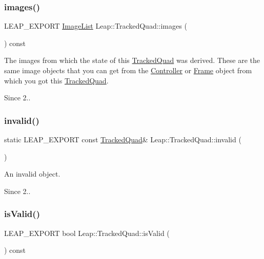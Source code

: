 \subsubsection{\texorpdfstring{images()}{images()}}
{\footnotesize\ttfamily L\+E\+A\+P\+\_\+\+E\+X\+P\+O\+RT \hyperlink{class_leap_1_1_image_list}{Image\+List} Leap\+::\+Tracked\+Quad\+::images (\begin{DoxyParamCaption}{ }\end{DoxyParamCaption}) const}

The images from which the state of this \hyperlink{class_leap_1_1_tracked_quad}{Tracked\+Quad} was derived. These are the same image objects that you can get from the \hyperlink{class_leap_1_1_controller}{Controller} or \hyperlink{class_leap_1_1_frame}{Frame} object from which you got this \hyperlink{class_leap_1_1_tracked_quad}{Tracked\+Quad}. 
\begin{DoxyCodeInclude}
\end{DoxyCodeInclude}
 \begin{DoxySince}{Since}
2.. 
\end{DoxySince}
\mbox{\label{class_leap_1_1_tracked_quad_ab9742292d499c87642dcadfde87385c5}} 
\subsubsection{\texorpdfstring{invalid()}{invalid()}}
{\footnotesize\ttfamily static L\+E\+A\+P\+\_\+\+E\+X\+P\+O\+RT const \hyperlink{class_leap_1_1_tracked_quad}{Tracked\+Quad}\& Leap\+::\+Tracked\+Quad\+::invalid (\begin{DoxyParamCaption}{ }\end{DoxyParamCaption})\hspace{0.3cm}{\ttfamily [static]}}

An invalid object. \begin{DoxySince}{Since}
2.. 
\end{DoxySince}
\mbox{\label{class_leap_1_1_tracked_quad_a5e7e10b0dad60d0951fcb0eae67b2300}} 
\subsubsection{\texorpdfstring{is\+Valid()}{isValid()}}
{\footnotesize\ttfamily L\+E\+A\+P\+\_\+\+E\+X\+P\+O\+RT bool Leap\+::\+Tracked\+Quad\+::is\+Valid (\begin{DoxyParamCaption}{ }\end{DoxyParamCaption}) const}

